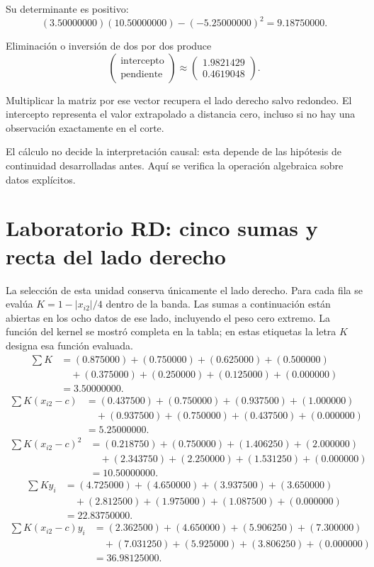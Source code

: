 \documentclass[11pt,a4paper]{article}
\begin{document}
Su determinante es positivo:
\[
(3.50000000)(10.50000000)-(-5.25000000)^2=9.18750000.
\]

Eliminación o inversión de dos por dos produce
\[
\begin{pmatrix}\text{intercepto}\\\text{pendiente}\end{pmatrix}\approx\begin{pmatrix}1.9821429\\0.4619048\end{pmatrix}.
\]

Multiplicar la matriz por ese vector recupera
el lado derecho salvo redondeo.
El intercepto representa el valor extrapolado
a distancia cero, incluso si no hay una
observación exactamente en el corte.

El cálculo no decide la interpretación causal:
esta depende de las hipótesis de continuidad
desarrolladas antes. Aquí se verifica
la operación algebraica sobre datos explícitos.

\clearpage
\section{Laboratorio RD: cinco sumas y recta del lado derecho}\label{unidad52}
La selección de esta unidad conserva únicamente el lado derecho.
Para cada fila se evalúa \(K=1-|x_{i2}|/4\) dentro de la banda.
Las sumas a continuación están abiertas en los ocho
datos de ese lado, incluyendo el peso cero extremo.
La función del kernel se mostró completa en la tabla;
en estas etiquetas la letra \(K\) designa esa función evaluada.
\[
\begin{aligned}
\sum K&=(0.875000)+(0.750000)+(0.625000)+(0.500000)\\&\quad+(0.375000)+(0.250000)+(0.125000)+(0.000000)\\&=3.50000000.\end{aligned}
\]
\[
\begin{aligned}
\sum K(x_{i2}-c)&=(0.437500)+(0.750000)+(0.937500)+(1.000000)\\&\quad+(0.937500)+(0.750000)+(0.437500)+(0.000000)\\&=5.25000000.\end{aligned}
\]
\[
\begin{aligned}
\sum K(x_{i2}-c)^2&=(0.218750)+(0.750000)+(1.406250)+(2.000000)\\&\quad+(2.343750)+(2.250000)+(1.531250)+(0.000000)\\&=10.50000000.\end{aligned}
\]
\[
\begin{aligned}
\sum Ky_i&=(4.725000)+(4.650000)+(3.937500)+(3.650000)\\&\quad+(2.812500)+(1.975000)+(1.087500)+(0.000000)\\&=22.83750000.\end{aligned}
\]
\[
\begin{aligned}
\sum K(x_{i2}-c)y_i&=(2.362500)+(4.650000)+(5.906250)+(7.300000)\\&\quad+(7.031250)+(5.925000)+(3.806250)+(0.000000)\\&=36.98125000.\end{aligned}
\]
\end{document}
